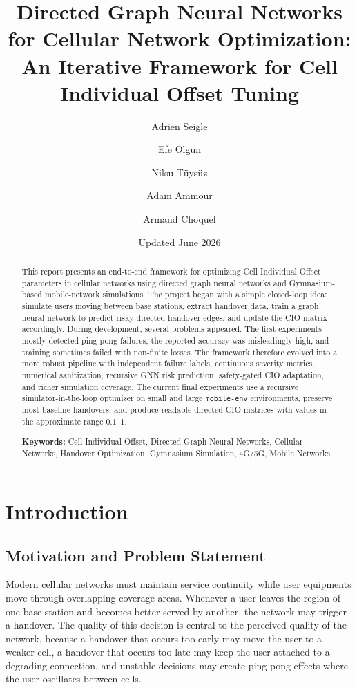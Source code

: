 \documentclass[11pt,a4paper]{article}
\title{Directed Graph Neural Networks for Cellular Network Optimization:\\An Iterative Framework for Cell Individual Offset Tuning}
\author{Adrien Seigle \and Efe Olgun \and Nilsu T\"uys\"uz \and Adam Ammour \and Armand Choquel}
\date{Updated June 2026}
\begin{document}
\maketitle

\begin{abstract}
This report presents an end-to-end framework for optimizing Cell Individual Offset parameters in cellular networks using directed graph neural networks and Gymnasium-based mobile-network simulations. The project began with a simple closed-loop idea: simulate users moving between base stations, extract handover data, train a graph neural network to predict risky directed handover edges, and update the CIO matrix accordingly. During development, several problems appeared. The first experiments mostly detected ping-pong failures, the reported accuracy was misleadingly high, and training sometimes failed with non-finite losses. The framework therefore evolved into a more robust pipeline with independent failure labels, continuous severity metrics, numerical sanitization, recursive GNN risk prediction, safety-gated CIO adaptation, and richer simulation coverage. The current final experiments use a recursive simulator-in-the-loop optimizer on small and large \texttt{mobile-env} environments, preserve most baseline handovers, and produce readable directed CIO matrices with values in the approximate range $0.1$--$1$.

\vspace{0.3cm}
\noindent\textbf{Keywords:} Cell Individual Offset, Directed Graph Neural Networks, Cellular Networks, Handover Optimization, Gymnasium Simulation, 4G/5G, Mobile Networks.
\end{abstract}

\newpage

\section{Introduction}
\label{sec:introduction}

\subsection{Motivation and Problem Statement}
Modern cellular networks must maintain service continuity while user equipments move through overlapping coverage areas. Whenever a user leaves the region of one base station and becomes better served by another, the network may trigger a handover. The quality of this decision is central to the perceived quality of the network, because a handover that occurs too early may move the user to a weaker cell, a handover that occurs too late may keep the user attached to a degrading connection, and unstable decisions may create ping-pong effects where the user oscillates between cells.
\end{document}
